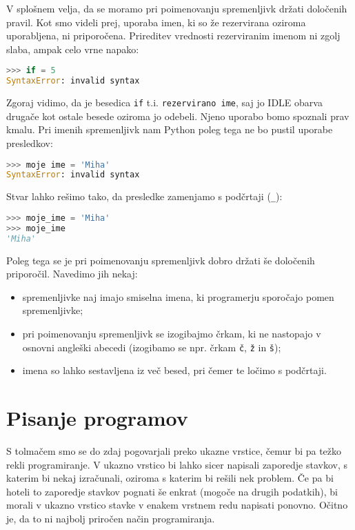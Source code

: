 V splošnem velja, da se moramo pri poimenovanju spremenljivk držati določenih pravil. Kot smo videli prej, uporaba imen, ki so že rezervirana oziroma uporabljena, ni priporočena. Prireditev vrednosti rezerviranim imenom ni zgolj slaba, ampak celo vrne napako:
\begin{lstlisting}[language=Python]
>>> if = 5
SyntaxError: invalid syntax
\end{lstlisting}
Zgoraj vidimo, da je besedica \texttt{if} t.i. \texttt{rezervirano ime}, saj jo IDLE obarva drugače kot ostale besede oziroma jo odebeli. Njeno uporabo bomo spoznali prav kmalu. Pri imenih spremenljivk nam Python poleg tega ne bo pustil uporabe presledkov:
\begin{lstlisting}[language=Python]
>>> moje ime = 'Miha'
SyntaxError: invalid syntax
\end{lstlisting}
Stvar lahko rešimo tako, da presledke zamenjamo s podčrtaji (\texttt{\_}):
\begin{lstlisting}[language=Python]
>>> moje_ime = 'Miha'
>>> moje_ime
'Miha'
\end{lstlisting}
Poleg tega se je pri poimenovanju spremenljivk dobro držati še določenih priporočil. Navedimo jih nekaj:
\begin{itemize}
    \item spremenljivke naj imajo smiselna imena, ki programerju sporočajo pomen spremenljivke;
    \item pri poimenovanju spremenljivk se izogibajmo črkam, ki ne nastopajo v osnovni angleški abecedi (izogibamo se npr. črkam \texttt{č}, \texttt{ž} in \texttt{š});
    \item imena so lahko sestavljena iz več besed, pri čemer te ločimo s podčrtaji.
\end{itemize}

\section{Pisanje programov}

S tolmačem smo se do zdaj pogovarjali preko ukazne vrstice, čemur bi pa težko rekli programiranje. V ukazno vrstico bi lahko sicer napisali zaporedje stavkov, s katerim bi nekaj izračunali, oziroma s katerim bi rešili nek problem. Če pa bi hoteli to zaporedje stavkov pognati še enkrat (mogoče na drugih podatkih), bi morali v ukazno vrstico stavke v enakem vrstnem redu napisati ponovno. Očitno je, da to ni najbolj priročen način programiranja.

